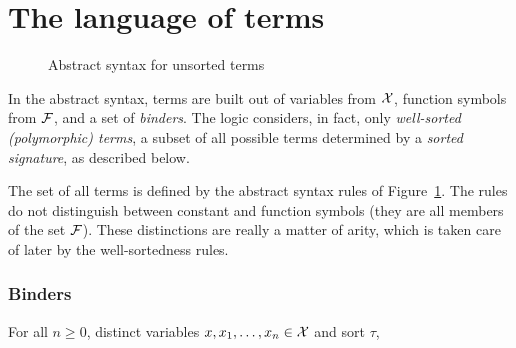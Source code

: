 %



\section{The language of terms} \label{sec:language}

\begin{figure}
\terms
\caption{Abstract syntax for unsorted terms}
\label{fig:abstract-terms}
\end{figure}

In the abstract syntax,
terms are built out of variables from $\mathcal{X}$, 
function symbols from $\mathcal{F}$, 
and a set of \emph{binders}.
%
The logic considers, in fact, only \emph{well-sorted (polymorphic) terms},
a subset of all possible terms determined 
by a \emph{sorted signature}, as described below.

The set of all terms is defined by the abstract syntax rules of 
Figure~\ref{fig:abstract-terms}.
The rules do not distinguish between constant and function symbols
(they are all members of the set $\mathcal{F}$). 
These distinctions are really a matter of arity, 
which is taken care of later by the well-sortedness rules.

\subsubsection{Binders}

For all $n \geq 0$,
distinct variables $x, x_1, \ldots, x_n \in \mathcal{X}$ and sort $\tau$,

